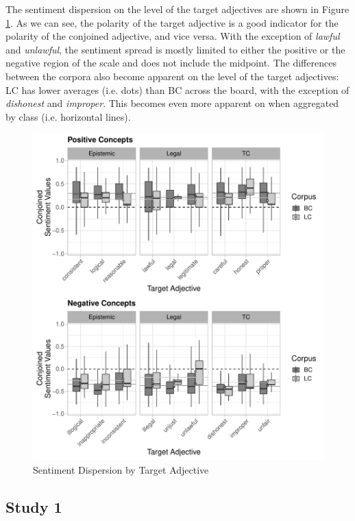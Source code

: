 \documentclass{article}
\begin{document}
The sentiment dispersion on the level of the target adjectives are shown in Figure \ref{fig:SDta}. As we can see, the polarity of the target adjective is a good indicator for the polarity of the conjoined adjective, and vice versa. With the exception of \textit{lawful} and \textit{unlawful}, the sentiment spread is mostly limited to either the positive or the negative region of the scale and does not include the midpoint. The differences between the corpora also become apparent on the level of the target adjectives: LC has lower averages (i.e. dots) than BC across the board, with the exception of \textit{dishonest} and \textit{improper}. This becomes even more apparent on when aggregated by class (i.e. horizontal lines).

\begin{figure}[ht]
\includegraphics[width=\textwidth, keepaspectratio]{bc_lc_summary_stats_adj-distr}
\caption{Sentiment Dispersion by Target Adjective}
\label{fig:SDta}
\end{figure}


\subsection{Study 1}
\end{document}

